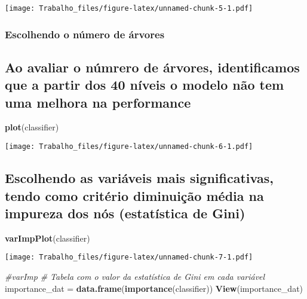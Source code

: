 \documentclass[]{article}
\newenvironment{Shaded}{\begin{snugshade}}{\end{snugshade}}
\newcommand{\KeywordTok}[1]{\textcolor[rgb]{0.13,0.29,0.53}{\textbf{#1}}}
\newcommand{\StringTok}[1]{\textcolor[rgb]{0.31,0.60,0.02}{#1}}
\newcommand{\CommentTok}[1]{\textcolor[rgb]{0.56,0.35,0.01}{\textit{#1}}}
\newcommand{\NormalTok}[1]{#1}
\begin{document}
\texttt{[image: Trabalho\_files/figure-latex/unnamed-chunk-5-1.pdf]}

\subsubsection{Escolhendo o número de
árvores}\label{escolhendo-o-numero-de-arvores}

\subsection{Ao avaliar o númrero de árvores, identificamos que a partir
dos 40 níveis o modelo não tem uma melhora na
performance}\label{ao-avaliar-o-numrero-de-arvores-identificamos-que-a-partir-dos-40-niveis-o-modelo-nao-tem-uma-melhora-na-performance}

\begin{Shaded}
\begin{Highlighting}[]
\KeywordTok{plot}\NormalTok{(classifier)}
\end{Highlighting}
\end{Shaded}

\texttt{[image: Trabalho\_files/figure-latex/unnamed-chunk-6-1.pdf]}

\subsection{Escolhendo as variáveis mais significativas, tendo como
critério diminuição média na impureza dos nós (estatística de
Gini)}\label{escolhendo-as-variaveis-mais-significativas-tendo-como-criterio-diminuicao-media-na-impureza-dos-nos-estatistica-de-gini}

\begin{Shaded}
\begin{Highlighting}[]
\KeywordTok{varImpPlot}\NormalTok{(classifier)}
\end{Highlighting}
\end{Shaded}

\texttt{[image: Trabalho\_files/figure-latex/unnamed-chunk-7-1.pdf]}

\begin{Shaded}
\begin{Highlighting}[]
\CommentTok{#varImp}
\CommentTok{# Tabela com o valor da estatística de Gini em cada variável}
\NormalTok{importance_dat =}\StringTok{ }\KeywordTok{data.frame}\NormalTok{(}\KeywordTok{importance}\NormalTok{(classifier))}
\KeywordTok{View}\NormalTok{(importance_dat)}
\end{Highlighting}
\end{Shaded}
\end{document}
